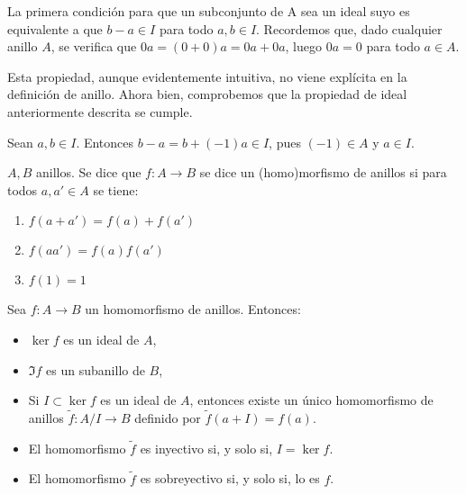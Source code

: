   \begin{obs}
      La primera condición para que un subconjunto de A sea un ideal suyo
      es equivalente a que \(b - a \in I\) para todo \(a, b \in I\). 
      Recordemos que, dado cualquier anillo \(A\), se verifica que \(0a = (0+0)a
      = 0a + 0a\), luego \(0a = 0\) para todo \(a \in A\).
      
      Esta propiedad, aunque evidentemente intuitiva, no viene explícita
      en la definición de anillo. Ahora bien, comprobemos que la propiedad
      de ideal anteriormente descrita se cumple.
      
      Sean \(a, b \in I\). Entonces \(b - a = b + (-1)a \in I\), pues \((-1) \in A\)
      y \(a \in I\). 
   \end{obs}

   \begin{df}
     \(A,B\) anillos. Se dice que \(f:A\longrightarrow B\) se dice un
     (homo)morfismo de anillos si para todos \(a,a'\in A\) se tiene:
     \begin{enumerate}
     \item \(f(a+a')=f(a)+f(a')\)
     \item \(f(aa')=f(a)f(a')\)
     \item \(f(1)=1\)
     \end{enumerate}
   \end{df} 

  
  \begin{teo}
    Sea \(f:A\longrightarrow B\) un homomorfismo de anillos. Entonces:
    \begin{itemize}
      \item \(\ker f\) es un ideal de \(A\),
      \item \(\Im f\) es un subanillo de \(B\),
      \item Si \(I\subset \ker f\) es un ideal de \(A\), entonces
        existe un único homomorfismo de anillos
        \(\tilde{f}:A/I\longrightarrow B\) definido por \(\tilde{f}(a+I)=f(a)\).
      \item El homomorfismo \(\tilde{f}\) es inyectivo si, y solo si,
        \(I=\ker f\).
      \item El homomorfismo \(\tilde{f}\) es sobreyectivo si, y solo si, lo es
        \(f\).
    \end{itemize}
  \end{teo}